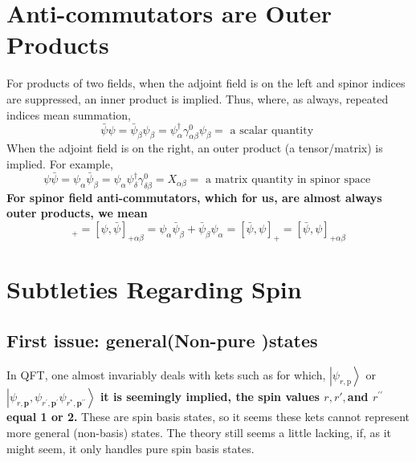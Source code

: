 \section{Anti-commutators are Outer Products}
For products of two fields, when the adjoint field is on the left and spinor indices are suppressed, an inner product is implied. Thus, where, as always, repeated indices mean summation,
\begin{equation}
\bar{\psi} \psi=\bar{\psi}_{\beta} \psi_{\beta}=\psi_{\alpha}^{\dagger} \gamma_{\alpha \beta}^{0} \psi_{\beta}=\text { a scalar quantity }
\end{equation}
When the adjoint field is on the right, an outer product (a tensor/matrix) is implied. For example,
\begin{equation}
\psi \bar{\psi}=\psi_{\alpha} \bar{\psi}_{\beta}=\psi_{\alpha} \psi_{\delta}^{\dagger} \gamma_{\delta \beta}^{0}=X_{\alpha \beta}=\text { a matrix quantity in spinor space }
\end{equation}
\textbf{For spinor field anti-commutators, which for us, are almost always outer products, we mean}
\begin{equation}
[\psi, \bar{\psi}]_{+}=[\psi, \bar{\psi}]_{+\alpha \beta}=\psi_{\alpha} \bar{\psi}_{\beta}+\bar{\psi}_{\beta} \psi_{\alpha}=[\bar{\psi}, \psi]_{+}=[\bar{\psi}, \psi]_{+\alpha \beta}
\end{equation}
\section{Subtleties Regarding Spin}
\subsection{First issue: general(Non-pure )states}
In QFT, one almost invariably deals with kets such as for which, $\left|\psi_{r, \mathrm{p}}\right\rangle$ or $\left|\psi_{r, \mathbf{p}}, \psi_{r^{\prime}, \mathbf{p}^{\prime}} \psi_{r^{*}, \mathbf{p}^{\prime \prime}}\right\rangle$ \textbf{it is seemingly implied, the spin values $r,r', $and $r^{\prime\prime}$ equal 1 or 2. }These are spin basis states, so it seems these kets cannot represent more general (non-basis) states. The theory still seems a little lacking, if, as it might seem, it only handles pure spin basis states.

